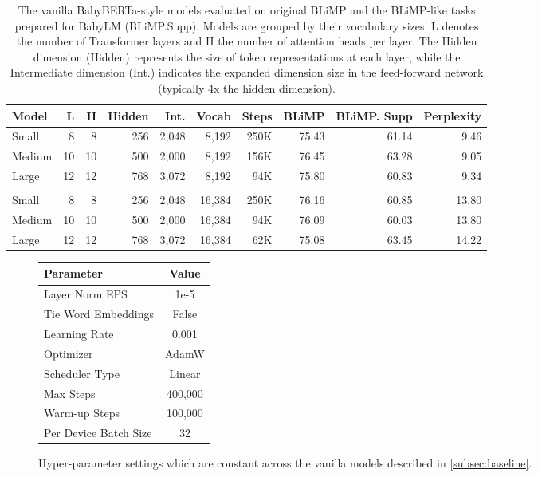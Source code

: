 \begin{table}
\centering
\small
\setlength{\tabcolsep}{4pt}  %
\begin{tabular}{l | rrrrr | rrrr}
\toprule
Model  & L & H & Hidden & Int. & Vocab & Steps & BLiMP & BLiMP. Supp & Perplexity \\
\midrule
Small  & 8 & 8 & 256 & 2,048   & 8,192   & 250K      & 75.43      & 61.14       & 9.46    \\
Medium & 10 & 10 & 500 & 2,000 & 8,192  & 156K      & 76.45      & 63.28        & 9.05  \\
Large  & 12 & 12 & 768 & 3,072 & 8,192   & 94K      & 75.80      & 60.83      & 9.34 \\[2mm]
\hline \\
Small  & 8 & 8 & 256 & 2,048   & 16,384  & 250K      & 76.16      & 60.85       & 13.80    \\
Medium & 10 & 10 & 500 & 2,000  & 16,384 & 94K      & 76.09      & 60.03        & 13.80     \\
Large  & 12 & 12 & 768 & 3,072 & 16,384  & 62K      & 75.08      & 63.45      & 14.22     \\
\bottomrule
\end{tabular}
\caption{\label{tbl:baseline-size-comparison} The vanilla BabyBERTa-style models evaluated on original BLiMP and the BLiMP-like tasks prepared for BabyLM (BLiMP.Supp). Models are grouped by their vocabulary sizes. L denotes the number of Transformer layers and H the number of attention heads per layer. The Hidden dimension (Hidden) represents the size of token representations at each layer, while the Intermediate dimension (Int.) indicates the expanded dimension size in the feed-forward network (typically 4x the hidden dimension).}
\end{table}

\begin{figure}
    \centering
    \small
    \begin{tabular}{lc}
    \toprule
         Parameter& Value\\
    \midrule
         Layer Norm EPS& 1e-5 \\
         Tie Word Embeddings & False \\
         Learning Rate & 0.001 \\
         Optimizer & AdamW \\
         Scheduler Type & Linear\\
         Max Steps & 400,000 \\
         Warm-up Steps & 100,000\\
         Per Device Batch Size & 32 \\
    \bottomrule
    \end{tabular}
    \caption{Hyper-parameter settings which are constant across the vanilla models described in \cref{subsec:baseline}.}
    \label{tbl:baseline_hyperparams}
\end{figure}

